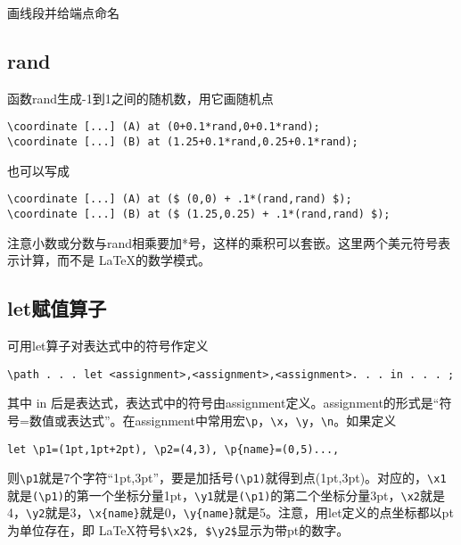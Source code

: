 \documentclass[UTF8]{ctexart}
\begin{document}
画线段并给端点命名\\



\subsection{rand}
函数rand生成-1到1之间的随机数，用它画随机点
\begin{lstlisting}
\coordinate [...] (A) at (0+0.1*rand,0+0.1*rand);
\coordinate [...] (B) at (1.25+0.1*rand,0.25+0.1*rand);
\end{lstlisting}
也可以写成
\begin{lstlisting}
\coordinate [...] (A) at ($ (0,0) + .1*(rand,rand) $);
\coordinate [...] (B) at ($ (1.25,0.25) + .1*(rand,rand) $);
\end{lstlisting}
注意小数或分数与rand相乘要加*号，这样的乘积可以套嵌。这里两个美元符号表示计算，而不是 \LaTeX 的数学模式。



\subsection{let赋值算子}

可用let算子对表达式中的符号作定义
\begin{lstlisting}
\path . . . let <assignment>,<assignment>,<assignment>. . . in . . . ;
\end{lstlisting}
其中 in 后是表达式，表达式中的符号由assignment定义。assignment的形式是“符号=数值或表达式”。在assignment中常用宏\verb!\p!，\verb!\x!，\verb!\y!，\verb!\n!。如果定义
\begin{lstlisting}
let \p1=(1pt,1pt+2pt), \p2=(4,3), \p{name}=(0,5)...,
\end{lstlisting}
则\verb!\p1!就是7个字符“1pt,3pt”，要是加括号\verb!(\p1)!就得到点(1pt,3pt)。对应的，\verb!\x1!就是\verb!(\p1)!的第一个坐标分量1pt，\verb!\y1!就是\verb!(\p1)!的第二个坐标分量3pt，\verb!\x2!就是4，\verb!\y2!就是3，\verb!\x{name}!就是0，\verb!\y{name}!就是5。注意，用let定义的点坐标都以pt为单位存在，即 \LaTeX 符号\verb!$\x2$, $\y2$!显示为带pt的数字。
\end{document}
